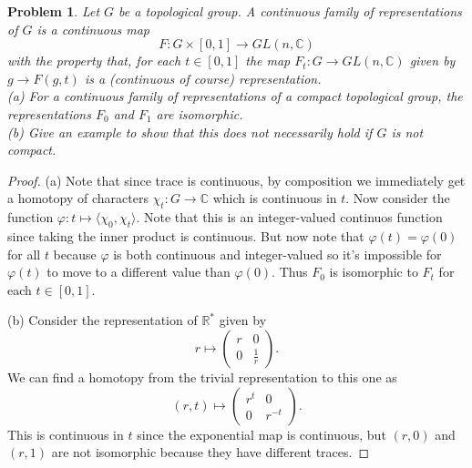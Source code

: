 \documentclass{article}
\newtheorem{problem}{Problem}
\begin{document}
\begin{problem}
Let $G$ be a topological group. A \emph{continuous family of representations of $G$} is a continuous map
\[
F: G \times [0,1] \to GL(n, \mathbb{C})
\]
with the property that, for each $t \in [0,1]$ the map $F_t : G \to GL(n, \mathbb{C})$ given by $g \to F(g,t)$ is a (continuous of course) representation.\\
(a) For a continuous family of representations of a \emph{compact} topological group, the representations $F_0$ and $F_1$ are isomorphic.\\
(b) Give an example to show that this does not necessarily hold if $G$ is not compact.
\end{problem}
\begin{proof}
(a) Note that since trace is continuous, by composition we immediately get a homotopy of characters $\chi_t : G \to \mathbb{C}$ which is continuous in $t$. Now consider the function $\varphi : t \mapsto \langle \chi_0, \chi_t \rangle$. Note that this is an integer-valued continuos function since taking the inner product is continuous. But now note that $\varphi(t) = \varphi(0)$ for all $t$ because $\varphi$ is both continuous and integer-valued so it's impossible for $\varphi(t)$ to move to a different value than $\varphi(0)$. Thus $F_0$ is isomorphic to $F_t$ for each $t \in [0,1]$.

(b) Consider the representation of $\mathbb{R}^*$ given by
\[
r \mapsto \left (\begin{array}{cc} r & 0\\ 0 & \frac{1}{r} \end{array} \right ).
\]
We can find a homotopy from the trivial representation to this one as
\[
(r,t) \mapsto \left ( \begin{array}{cc} r^t & 0\\ 0 & r^{-t} \end{array} \right ).
\]
This is continuous in $t$ since the exponential map is continuous, but $(r,0)$ and $(r,1)$ are not isomorphic because they have different traces.
\end{proof}
\end{document}
